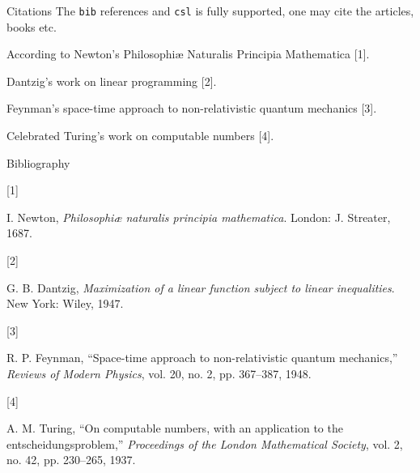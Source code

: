 \documentclass[
  ignorenonframetext,
  aspectratio=169,
]{beamer}
\newlength{\cslhangindent}
\newlength{\csllabelwidth}
\newenvironment{CSLReferences}[2] %
 {\begin{list}{}{%
  \setlength{\itemindent}{0pt}
  \setlength{\leftmargin}{0pt}
  \setlength{\parsep}{0pt}
  \ifodd #1
   \setlength{\leftmargin}{\cslhangindent}
   \setlength{\itemindent}{-1\cslhangindent}
  \fi
  \setlength{\itemsep}{#2\baselineskip}}}
 {\end{list}}
\newcommand{\CSLLeftMargin}[1]{\parbox[t]{\csllabelwidth}{\strut#1\strut}}
\newcommand{\CSLRightInline}[1]{\parbox[t]{\linewidth - \csllabelwidth}{\strut#1\strut}}
\theoremstyle{plain}
\theoremstyle{remark}
\begin{document}
\begin{frame}[fragile]{Citations}
\label{citations}
The \texttt{bib} references and \texttt{csl} is fully supported, one may
cite the articles, books etc.

According to Newton's Philosophiæ Naturalis Principia Mathematica
{[}1{]}.

Dantzig's work on linear programming {[}2{]}.

Feynman's space-time approach to non-relativistic quantum mechanics
{[}3{]}.

Celebrated Turing's work on computable numbers {[}4{]}.
\end{frame}

\begin{frame}{Bibliography}
\label{bibliography}
\label{refs}
\begin{CSLReferences}{0}{0}
\CSLLeftMargin{{[}1{]} }%
\CSLRightInline{I. Newton, \emph{Philosophiæ naturalis principia
mathematica}. London: J. Streater, 1687.}

\CSLLeftMargin{{[}2{]} }%
\CSLRightInline{G. B. Dantzig, \emph{Maximization of a linear function
subject to linear inequalities}. New York: Wiley, 1947.}

\CSLLeftMargin{{[}3{]} }%
\CSLRightInline{R. P. Feynman, {``Space-time approach to
non-relativistic quantum mechanics,''} \emph{Reviews of Modern Physics},
vol. 20, no. 2, pp. 367--387, 1948.}

\CSLLeftMargin{{[}4{]} }%
\CSLRightInline{A. M. Turing, {``On computable numbers, with an
application to the entscheidungsproblem,''} \emph{Proceedings of the
London Mathematical Society}, vol. 2, no. 42, pp. 230--265, 1937.}

\end{CSLReferences}
\end{frame}
\end{document}
